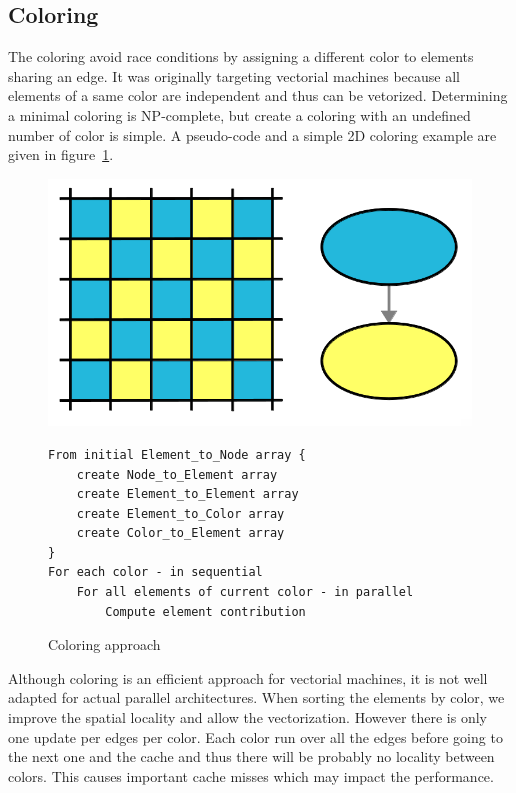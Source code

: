 \documentclass{IOS-Book-Article}
\begin{document}
\subsection{Coloring}
\label{sec:col}
The coloring avoid race conditions by assigning a different color to elements sharing an edge.
It was originally targeting vectorial machines because all elements of a same color are independent and thus can be vetorized.
Determining a minimal coloring is NP-complete, but create a coloring with an undefined number of color is simple.
A pseudo-code and a simple 2D coloring example are given in figure~\ref{fig:colApp}.

\begin{figure}[htp]
 \includegraphics[scale=0.2]{Coloring_approach.png}
 \begin{verbatim}
From initial Element_to_Node array {
    create Node_to_Element array
    create Element_to_Element array
    create Element_to_Color array
    create Color_to_Element array
}
For each color - in sequential
    For all elements of current color - in parallel
        Compute element contribution
 \end{verbatim}
 \caption{Coloring approach}
 \label{fig:colApp}
\end{figure}

Although coloring is an efficient approach for vectorial machines, it is not well adapted for actual parallel architectures.
When sorting the elements by color, we improve the spatial locality and allow the vectorization. However there is only one update per edges per color. Each color run over all the edges before going to the next one and the cache and thus there will be probably no locality between colors. This causes important cache misses which may impact the performance.
\end{document}

